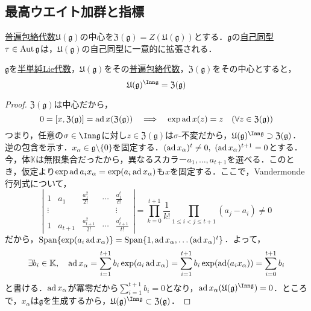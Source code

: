 \documentclass[rep_main]{subfiles}
\begin{document}
\subsection{最高ウエイト加群と指標}
\hyperref[def:univ-env-alg]{普遍包絡代数}$\mathfrak{U}(\mathfrak{g})$の中心を$\mathfrak{Z}(\mathfrak{g}) = Z(\mathfrak{U}(\mathfrak{g}))$とする．$\mathfrak{g}$の\hyperref[def:auto-LieAlg]{自己同型}$\tau \in \operatorname{Aut}\mathfrak{g}$は，$\mathfrak{U}(\mathfrak{g})$の自己同型に一意的に拡張される．
\begin{mytheo}[label=thm:Inng-invariant-Ug]{}
	$\mathfrak{g}$を\hyperref[def:semisimple-LieAlg]{半単純Lie代数}，$\mathfrak{U}(\mathfrak{g})$をその\hyperref[def:univ-env-alg]{普遍包絡代数}，$\mathfrak{Z}(\mathfrak{g})$をその中心とすると，
	\begin{equation}
		\mathfrak{U}(\mathfrak{g})^{\Inn \mathfrak{g}} = \mathfrak{Z}(\mathfrak{g})
	\end{equation}
\end{mytheo}
\begin{proof}
	$\mathfrak{Z}(\mathfrak{g})$は中心だから，
	\begin{equation}
		0 = [x, \mathfrak{Z}(\mathfrak{g})] = \operatorname{ad} x(\mathfrak{Z}(\mathfrak{g}))  \quad \Longrightarrow \quad  \exp\operatorname{ad} x(z) = z\quad  (\forall z \in \mathfrak{Z}(\mathfrak{g}))
	\end{equation}
	つまり，任意の$\sigma \in \Inn\mathfrak{g}$に対し$z \in \mathfrak{Z}(\mathfrak{g})$は$\sigma$-不変だから，$\mathfrak{U}(\mathfrak{g})^{\Inn \mathfrak{g}} \supset \mathfrak{Z}(\mathfrak{g})$．\\
	逆の包含を示す．$x_\alpha \in \mathfrak{g} \setminus \{0\}$を固定する．$(\operatorname{ad} x_\alpha)^t \neq 0,\ (\operatorname{ad} x_\alpha)^{t+1} = 0$とする．\\
	今，体$\mathbb{K}$は無限集合だったから，異なるスカラー$a_1, \ldots, a_{t+1}$を選べる．このとき，仮定より$\exp \operatorname{ad} a_ix_\alpha = \exp (a_i\operatorname{ad} x_\alpha)$も$x$を固定する．ここで，Vandermonde行列式について，
	\begin{equation}
		\left|\begin{array}{ccccc}
			1 & a_1 & \frac{a_1^2}{2!} & \cdots & \frac{a_1^t}{t!} \\
			\vdots &&&& \vdots \\
			1 & a_{t+1} & \frac{a_{t+1}^2}{2!} & \cdots & \frac{a_{t+1}^t}{t!}
		\end{array}\right| = \prod_{k=0}^{t+1}\frac{1}{k!} \prod_{1 \leq i < j \leq t+1} (a_j - a_i) \neq 0
	\end{equation}
	だから，$\operatorname{Span}\{\exp (a_i\operatorname{ad} x_\alpha)\} = \operatorname{Span}\{1, \operatorname{ad} x_\alpha, \ldots (\operatorname{ad} x_\alpha)^t\}$．よって，
	\begin{equation}
		\exists b_i \in \mathbb{K},\quad  \operatorname{ad} x_\alpha = \sum_{i=1}^{t+1} b_i \exp (a_i\operatorname{ad} x_\alpha) = \sum_{i=1}^{t+1} b_i \exp(\operatorname{ad} (a_i x_\alpha)) = \sum_{i=0}^{t+1} b_i
	\end{equation}
	と書ける．$\operatorname{ad} x_\alpha$が冪零だから$\sum_{i=1}^{t+1} b_i = 0$となり，$\ad x_\alpha(\mathfrak{U}(\mathfrak{g})^{\Inn \mathfrak{g}}) = 0$．ところで，$x_\alpha$は$\mathfrak{g}$を生成するから，$\mathfrak{U}(\mathfrak{g})^{\Inn \mathfrak{g}} \subset \mathfrak{Z}(\mathfrak{g})$．
\end{proof}
\end{document}
